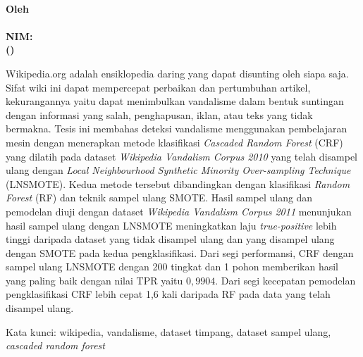 \begin{center}
\textbf{\large
	\MakeUppercase{\mytitle{}} \\
	\bigskip
	\textnormal{Oleh} \\
	\myname{} \\
	NIM: \mysid{} \\
	(\mydept{}) \\
}
\end{center}

\bigskip
\bigskip
\bigskip

Wikipedia.org adalah ensiklopedia daring yang dapat disunting oleh siapa saja.
Sifat wiki ini dapat mempercepat perbaikan dan pertumbuhan artikel,
kekurangannya yaitu dapat menimbulkan vandalisme dalam bentuk suntingan dengan
informasi yang salah, penghapusan, iklan, atau teks yang tidak bermakna.
Tesis ini membahas deteksi vandalisme menggunakan pembelajaran mesin
dengan menerapkan metode klasifikasi
\textit{Cascaded Random Forest} (CRF)
yang dilatih pada dataset
\textit{Wikipedia Vandalism Corpus 2010}
yang telah
disampel ulang dengan
\textit{Local Neighbourhood Synthetic Minority Over-sampling Technique}
(LNSMOTE).
Kedua metode tersebut dibandingkan dengan klasifikasi
\textit{Random Forest} (RF)
dan teknik sampel ulang SMOTE.
Hasil sampel ulang dan pemodelan diuji dengan dataset
\textit{Wikipedia Vandalism Corpus 2011}
menunjukan hasil sampel ulang dengan LNSMOTE meningkatkan laju
\textit{true-positive} lebih tinggi daripada dataset yang tidak disampel ulang
dan yang disampel ulang dengan SMOTE pada kedua pengklasifikasi.
Dari segi performansi, CRF dengan sampel ulang LNSMOTE dengan 200 tingkat dan 1
pohon memberikan hasil yang paling baik dengan nilai TPR yaitu $0,9904$.
Dari segi kecepatan pemodelan pengklasifikasi CRF lebih cepat 1,6 kali daripada
RF pada data yang telah disampel ulang.

Kata kunci: wikipedia, vandalisme, dataset timpang, dataset sampel ulang,
\textit{cascaded random forest}
